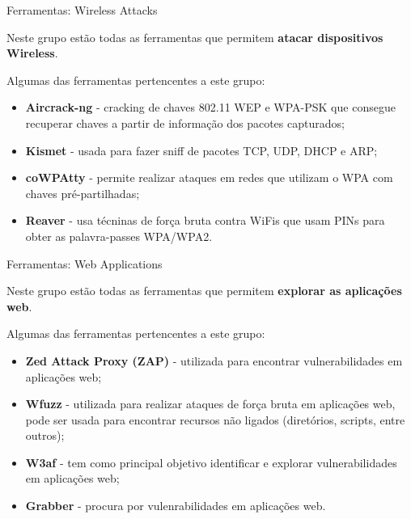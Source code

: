 \documentclass{beamer}
\begin{document}
\begin{frame}{Ferramentas: Wireless Attacks}

Neste grupo estão todas as ferramentas que permitem \textbf{atacar dispositivos Wireless}.

\hfill

Algumas das ferramentas pertencentes a este grupo:
    \begin{itemize}
        \item \textbf{Aircrack-ng} - cracking de chaves 802.11 WEP e WPA-PSK que consegue recuperar chaves a partir de informação dos pacotes capturados;
        \item \textbf{Kismet} - usada para fazer sniff de pacotes TCP, UDP, DHCP e ARP;
        \item \textbf{coWPAtty} - permite realizar ataques em redes que utilizam o WPA com chaves pré-partilhadas;
        \item \textbf{Reaver} - usa técninas de força bruta contra WiFis que usam PINs para obter as palavra-passes WPA/WPA2.
    \end{itemize}
\end{frame}
\begin{frame}{Ferramentas: Web Applications}

Neste grupo estão todas as ferramentas que permitem \textbf{explorar as aplicações web}.

\hfill

Algumas das ferramentas pertencentes a este grupo:
    \begin{itemize}
        \item \textbf{Zed Attack Proxy (ZAP)} - utilizada para encontrar vulnerabilidades em aplicações web;
        \item \textbf{Wfuzz} - utilizada para realizar ataques de força bruta em aplicações web, pode ser usada para encontrar recursos não ligados (diretórios, scripts, entre outros);
        \item \textbf{W3af} - tem como principal objetivo identificar e explorar vulnerabilidades em aplicações web;
        \item \textbf{Grabber} - procura por vulenrabilidades em aplicações web.
    \end{itemize}
\end{frame}
\end{document}

